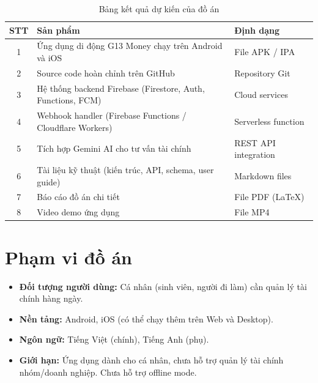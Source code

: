 \begin{table}[H]
\centering
\caption{Bảng kết quả dự kiến của đồ án}
\label{tab:expected-results}
\begin{tabularx}{\textwidth}{|c|X|l|}
\hline
\textbf{STT} & \textbf{Sản phẩm} & \textbf{Định dạng} \\
\hline
1 & Ứng dụng di động G13 Money chạy trên Android và iOS & File APK / IPA \\
\hline
2 & Source code hoàn chỉnh trên GitHub & Repository Git \\
\hline
3 & Hệ thống backend Firebase (Firestore, Auth, Functions, FCM) & Cloud services \\
\hline
4 & Webhook handler (Firebase Functions / Cloudflare Workers) & Serverless function \\
\hline
5 & Tích hợp Gemini AI cho tư vấn tài chính & REST API integration \\
\hline
6 & Tài liệu kỹ thuật (kiến trúc, API, schema, user guide) & Markdown files \\
\hline
7 & Báo cáo đồ án chi tiết & File PDF (LaTeX) \\
\hline
8 & Video demo ứng dụng & File MP4 \\
\hline
\end{tabularx}
\end{table}

\section{Phạm vi đồ án}

\begin{itemize}
  \item \textbf{Đối tượng người dùng:} Cá nhân (sinh viên, người đi làm) cần quản lý tài chính hàng ngày.
  \item \textbf{Nền tảng:} Android, iOS (có thể chạy thêm trên Web và Desktop).
  \item \textbf{Ngôn ngữ:} Tiếng Việt (chính), Tiếng Anh (phụ).
  \item \textbf{Giới hạn:} Ứng dụng dành cho cá nhân, chưa hỗ trợ quản lý tài chính nhóm/doanh nghiệp. Chưa hỗ trợ offline mode.
\end{itemize}

